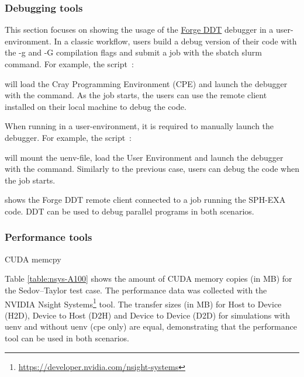 \subsubsection{Debugging tools}

This section focuses on showing the usage of the \href{https://www.linaroforge.com}{Forge DDT} debugger in a user-environment. 
In a classic workflow, users build a debug version of their code with the -g and -G compilation flags and submit a job with the sbatch slurm command.
For example, the  script~:
%

%
will load the Cray Programming Environment (CPE) and launch the debugger with the  command.
As the job starts, the users can use the remote client installed on their local machine to debug the code.

When running in a user-environment, it is required to manually launch the debugger.
For example, the  script~:
%

%
will mount the uenv-file, load the User Environment and launch the debugger with the  command.
Similarly to the previous case, users can debug the code when the job starts.

 shows the Forge DDT remote client connected to a job running the SPH-EXA code.
DDT can be used to debug parallel programs in both scenarios.

\subsubsection{Performance tools}

\begin{table}[htp!]
    \centering
    \caption{CUDA memcpy}
    \label{table:nsys-A100}
\end{table}

Table \ref{table:nsys-A100} shows the amount of CUDA memory copies (in MB) for the Sedov--Taylor test case.
The performance data was collected with the NVIDIA {Nsight Systems\footnote{\url{https://developer.nvidia.com/nsight-systems}}}  tool.
The transfer sizes (in MB) for Host to Device (H2D), Device to Host (D2H) and Device to Device (D2D) for simulations with uenv and without uenv (cpe only) are equal, demonstrating that the performance tool can be used in both scenarios.

